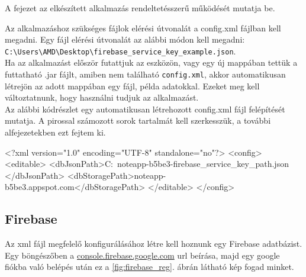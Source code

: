
A fejezet az elkészített alkalmazás rendeltetésszerű működését mutatja be.

Az alkalmazáshoz szükséges fájlok elérési útvonalát a config.xml fájlban kell megadni.
Egy fájl elérési útvonalát az alábbi módon kell megadni: \\\texttt{C:\textbackslash Users\textbackslash AMD\textbackslash Desktop\textbackslash firebase\_service\_key\_example.json}.
\vspace{5pt}\\Ha az alkalmazást először futattjuk az eszközön, vagy egy új mappában tettük a futtatható .jar fájlt, amiben nem található \texttt{config.xml}, akkor automatikusan létrejön az adott mappában egy fájl, példa adatokkal. Ezeket meg kell változtatnunk, hogy használni tudjuk az alkalmazást.
\vspace{15pt}\\Az alábbi kódrészlet egy automatikusan létrehozott config.xml fájl felépítését mutatja. A pirossal számozott sorok tartalmát kell szerkesszük, a további alfejezetekben ezt fejtem ki.
\begin{java}
<?xml version="1.0" encoding="UTF-8" standalone="no"?>
<config>
 <editable>
  <dbJsonPath>C:\Users\Example\Downloads\
   noteapp-b5be3-firebase\_service\_key\_path.json
  </dbJsonPath>
  <dbStoragePath>noteapp-b5be3.appspot.com</dbStoragePath>
 </editable>
</config>	
\end{java}

\subsection{Firebase}
Az xml fájl megfelelő konfigurálásához létre kell hoznunk egy Firebase adatbázist.
\vspace{5pt}\\Egy böngészőben a \href{https://console.firebase.google.com/u/0/}{console.firebase.google.com} url beírása, majd egy google fiókba való belépés után ez a \ref{fig:firebase_reg}. ábrán látható kép fogad minket.

